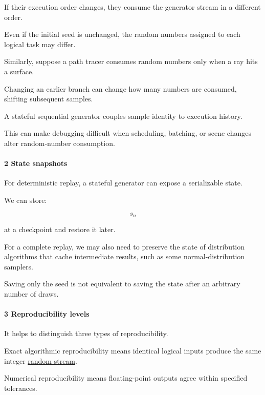 If their execution order changes, they consume the generator stream in a different order.

Even if the initial seed is unchanged, the random numbers assigned to each logical task may differ.

Similarly, suppose a path tracer consumes random numbers only when a ray hits a surface.

Changing an earlier branch can change how many numbers are consumed, shifting subsequent samples.

A stateful sequential generator couples sample identity to execution history.

This can make debugging difficult when scheduling, batching, or scene changes alter random-number consumption.

\paragraph{2 State snapshots}\label{02-foundations-ii-ch029-state-snapshots}

\hypertarget{02-foundations-ii-ch029-state-snapshots}{}

For deterministic replay, a stateful generator can expose a serializable state.

We can store:

\[
 s_n
\]

at a checkpoint and restore it later.

For a complete replay, we may also need to preserve the state of distribution algorithms that cache intermediate results, such as some normal-distribution samplers.

Saving only the seed is not equivalent to saving the state after an arbitrary number of draws.

\paragraph{3 Reproducibility levels}\label{02-foundations-ii-ch029-reproducibility-levels}

\hypertarget{02-foundations-ii-ch029-reproducibility-levels}{}

It helps to distinguish three types of reproducibility.

Exact algorithmic reproducibility means identical logical inputs produce the same integer \hyperref[02-foundations-ii-ch029-a-computer-produces-deterministic-pseudorandom-sequences]{random stream}.

Numerical reproducibility means floating-point outputs agree within specified tolerances.

